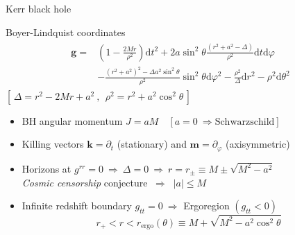 \documentclass[9pt,serif,mathserif]{beamer}
\newcommand{\dd}{\mathrm{d}}
\begin{document}
\begin{frame}[fragile]{Kerr black hole}

    \vspace{0.15cm}

    \begin{block}{Boyer-Lindquist coordinates}
        \begin{align*}
            \begin{split}
                \bm{g} = & \left(1 - \frac{2 M r}{\rho^2} \right) \dd t^2 + 2 a \sin^2\theta \frac{(r^2+a^2-\Delta)}{\rho^2} \dd t \dd \varphi \\
                &- \frac{(r^2+a^2)^2- \Delta a^2 \sin^2\theta}{\rho^2} \sin^2\theta \dd\varphi^2 - \frac{\rho^2}{\Delta} \dd r^2 - \rho^2 \dd \theta^2
            \end{split}
        \end{align*}
        \centering
        $[\,\Delta=r^2 - 2 M r + a^2 ~,~~ \rho^2 = r^2 + a^2 \cos^2\theta\,]$
    \end{block}

    \begin{itemize}
        \setlength\itemsep{0.8em}
        \item BH angular momentum $J = a M \quad\left[ a=0 ~\Rightarrow \text{Schwarzschild} \right]$ 
        \item Killing vectors $\bm{k}=\partial_t$ (stationary) and $\bm{m}=\partial_\varphi$ (axisymmetric)
        \item Horizons at $g^{rr}=0 ~\Rightarrow~ \Delta=0 ~\Rightarrow~ r = r_{\pm} \equiv M \pm \sqrt{M^2-a^2}$ \\
        \emph{Cosmic censorship} conjecture $~\Rightarrow~$ $|a| \le M$
        
        \item Infinite redshift boundary $g_{tt}=0 ~\Rightarrow$ \alert{Ergoregion} $(g_{tt}<0)$
        $$r_+<r<r_\mathrm{ergo}(\theta) \equiv M + \sqrt{M^2 - a^2 \cos^2\theta}$$
    \end{itemize}
\end{frame}
\end{document}
